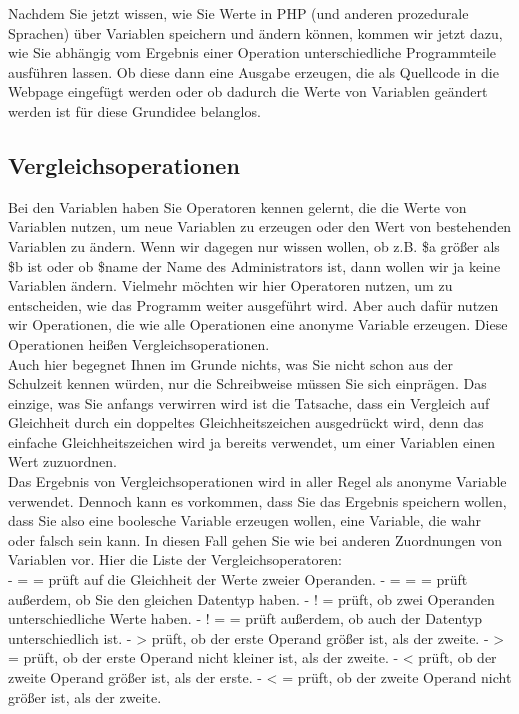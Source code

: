 Nachdem Sie jetzt wissen, wie Sie Werte in PHP (und anderen prozedurale Sprachen) über Variablen speichern und ändern können, kommen wir jetzt dazu, wie Sie abhängig vom Ergebnis einer Operation unterschiedliche Programmteile ausführen lassen. Ob diese dann eine Ausgabe erzeugen, die als Quellcode in die Webpage eingefügt werden oder ob dadurch die Werte von Variablen geändert werden ist für diese Grundidee belanglos.

\subsection{Vergleichsoperationen}

Bei den Variablen haben Sie Operatoren kennen gelernt, die die Werte von Variablen nutzen, um neue Variablen zu erzeugen oder den Wert von bestehenden Variablen zu ändern. Wenn wir dagegen nur wissen wollen, ob z.B. \$a größer als \$b ist oder ob \$name der Name des Administrators ist, dann wollen wir ja keine Variablen ändern. Vielmehr möchten wir hier Operatoren nutzen, um zu entscheiden, wie das Programm weiter ausgeführt wird. Aber auch dafür nutzen wir Operationen, die wie alle Operationen eine anonyme Variable erzeugen. Diese Operationen heißen Vergleichsoperationen.\\


Auch hier begegnet Ihnen im Grunde nichts, was Sie nicht schon aus der Schulzeit kennen würden, nur die Schreibweise müssen Sie sich einprägen. Das einzige, was Sie anfangs verwirren wird ist die Tatsache, dass ein Vergleich auf Gleichheit durch ein doppeltes Gleichheitszeichen ausgedrückt wird, denn das einfache Gleichheitszeichen wird ja bereits verwendet, um einer Variablen einen Wert zuzuordnen.\\


Das Ergebnis von Vergleichsoperationen wird in aller Regel als anonyme Variable verwendet. Dennoch kann es vorkommen, dass Sie das Ergebnis speichern wollen, dass Sie also eine boolesche Variable erzeugen wollen, eine Variable, die wahr oder falsch sein kann. In diesen Fall gehen Sie wie bei anderen Zuordnungen von Variablen vor.
Hier die Liste der Vergleichsoperatoren:\\


-	= =	prüft auf die Gleichheit der Werte zweier Operanden.
-	= = =	prüft außerdem, ob Sie den gleichen Datentyp haben.
-	! =	prüft, ob zwei Operanden unterschiedliche Werte haben.
-	! = = 	prüft außerdem, ob auch der Datentyp unterschiedlich ist.
-	>	prüft, ob der erste Operand größer ist, als der zweite.
-	> =	prüft, ob der erste Operand nicht kleiner ist, als der zweite.
-	<	prüft, ob der zweite Operand größer ist, als der erste.
-	< =	prüft, ob der zweite Operand nicht größer ist, als der zweite.

